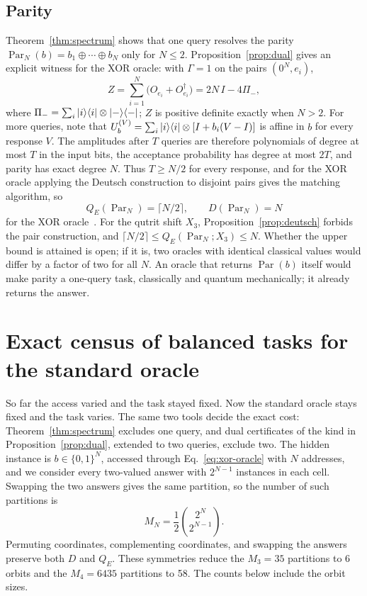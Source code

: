 \documentclass[
  aps,
  pra,
  reprint,
  nofootinbib
]{revtex4-2}
\begin{document}
\subsection{Parity}

Theorem~\ref{thm:spectrum} shows that one query resolves the parity
\(\operatorname{Par}_N(b)=b_1\oplus\cdots\oplus b_N\) only for \(N\le2\). Proposition~\ref{prop:dual} gives an explicit
witness for the XOR oracle: with \(\Gamma=1\) on the pairs \((0^N,e_i)\),
\begin{equation}
 Z=\sum_{i=1}^N\bigl(O_{e_i}+O_{e_i}^\dagger\bigr)=2N\,I-4\Pi_-,
 \label{eq:parity-witness}
\end{equation}
where \(\Pi_-=\sum_{i}\ket i\!\bra i\otimes\ket-\!\bra-\); \(Z\) is positive
definite exactly when \(N>2\). For more queries, note that
\(U_b^{(V)}=\sum_i\ket i\!\bra i\otimes[I+b_i(V-I)]\) is affine in \(b\) for
every response \(V\). The amplitudes after \(T\) queries are therefore
polynomials of degree at most \(T\) in the input bits, the acceptance
probability has degree at most \(2T\), and parity has exact degree \(N\). Thus
\(T\ge N/2\) for every response, and for the XOR oracle applying the Deutsch
construction to disjoint pairs gives the matching algorithm, so
\begin{equation}
 Q_E(\operatorname{Par}_N)=\lceil N/2\rceil,
 \qquad D(\operatorname{Par}_N)=N
 \label{eq:parity-complexity}
\end{equation}
for the XOR oracle~\cite{bbcmw-01,Farhi-98}. For the qutrit shift \(X_3\),
Proposition~\ref{prop:deutsch} forbids the pair construction, and
\(\lceil N/2\rceil\le Q_E(\operatorname{Par}_N;X_3)\le N\). Whether the upper
bound is attained is open; if it is, two oracles with identical classical
values would differ by a factor of two for all \(N\). An oracle that returns
\(\operatorname{Par}(b)\) itself would make parity a one-query task,
classically and quantum mechanically; it already returns the answer.

\section{Exact census of balanced tasks for the standard oracle}
\label{sec:census}

So far the access varied and the task stayed fixed. Now the standard oracle
stays fixed and the task varies. The same two tools decide the exact cost:
Theorem~\ref{thm:spectrum} excludes one query, and dual certificates of the
kind in Proposition~\ref{prop:dual}, extended to two queries, exclude two.
The hidden instance is \(b\in\{0,1\}^N\),
accessed through Eq.~\eqref{eq:xor-oracle} with \(N\) addresses, and we
consider every two-valued answer with \(2^{N-1}\) instances in each cell.
Swapping the two answers gives the same partition, so the number of such
partitions is
\begin{equation}
 M_N=\frac12\binom{2^N}{2^{N-1}}.
 \label{eq:balanced-count}
\end{equation}
Permuting coordinates, complementing coordinates, and swapping the answers
preserve both \(D\) and \(Q_E\). These symmetries reduce the \(M_3=35\)
partitions to 6 orbits and the \(M_4=6435\) partitions to 58. The counts below
include the orbit sizes.
\end{document}
